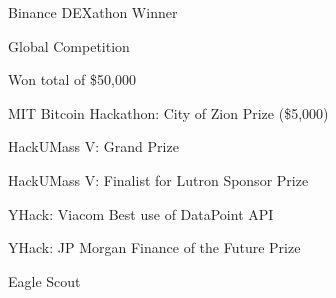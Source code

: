 
\begin{tightemize}
\item Binance DEXathon Winner
  \begin{tightemize}
  \item Global Competition
  \item Won total of \$50,000
  \end{tightemize}
\item MIT Bitcoin Hackathon: City of Zion Prize (\$5,000)
\item HackUMass V: Grand Prize
\item HackUMass V: Finalist for Lutron Sponsor Prize
\item YHack: Viacom Best use of DataPoint API
\item YHack: JP Morgan Finance of the Future Prize
\item Eagle Scout
\end{tightemize}